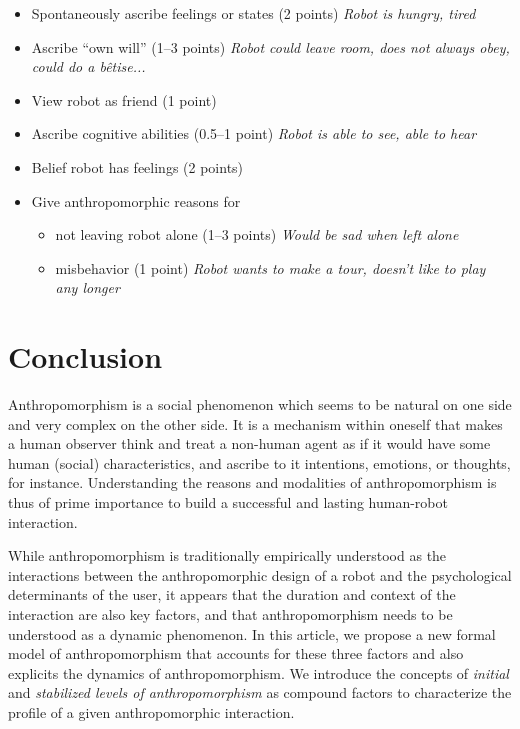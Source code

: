 \documentclass{frontiersSCNS} %
\begin{document}
\begin{itemize}
    \item Spontaneously ascribe feelings or states (2 points) {\it Robot is
        hungry, tired}
    \item Ascribe ``own will'' (1--3 points) {\it Robot could leave room, does not
        always obey, could do a b\^{e}tise...}
    \item View robot as friend (1 point)
    \item Ascribe cognitive abilities (0.5--1 point) {\it Robot is able to see,
        able to hear}
    \item Belief robot has feelings (2 points)
    \item Give anthropomorphic reasons for
        \begin{itemize}
            \item not leaving robot alone (1--3 points) {\it Would be sad when
                left alone}
            \item misbehavior (1 point) {\it Robot wants to make a tour, doesn't
                like to play any longer}
        \end{itemize}
\end{itemize}




%
%
%
%
%
%


\section{Conclusion}
\label{sec:conclusion}

Anthropomorphism is a social phenomenon which seems to be natural on one side
and very complex on the other side. It is a mechanism within oneself that makes
a human observer think and treat a non-human agent as if it would have some
human (social) characteristics, and ascribe to it intentions, emotions, or
thoughts, for instance. Understanding the reasons and modalities of
anthropomorphism is thus of prime importance to build a successful and lasting
human-robot interaction.

While anthropomorphism is traditionally empirically understood as the
interactions between the anthropomorphic design of a robot and the psychological
determinants of the user, it appears that the duration and context of the
interaction are also key factors, and that anthropomorphism needs to be
understood as a dynamic phenomenon. In this article, we propose a new formal
model of anthropomorphism that accounts for these three factors and also
explicits the dynamics of anthropomorphism. We introduce the concepts of
\emph{initial} and \emph{stabilized levels of anthropomorphism} as compound
factors to characterize the profile of a given anthropomorphic interaction.
\end{document}
